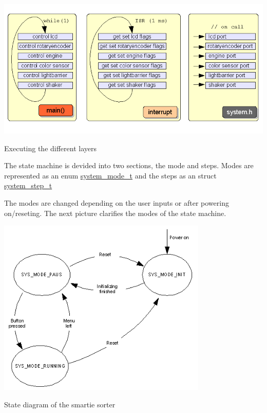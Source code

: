  \begin{Image}
\begin{center}
\includegraphics[width=15cm]{state-machine.png}\caption{Executing the different layers}
\end{center}
\end{Image}


The state machine is devided into two sections, the mode and steps. Modes are represented as an enum \hyperlink{system_8h_6e4cea4b6246f491c526211f5405627d}{system\_\-mode\_\-t} and the steps as an struct \hyperlink{structsystem__step__t}{system\_\-step\_\-t}

The modes are changed depending on the user inputs or after powering on/reseting. The next picture clarifies the modes of the state machine.

 \begin{Image}
\begin{center}
\includegraphics[width=10cm]{state-machine-modes.png}\caption{State diagram of the smartie sorter}
\end{center}
\end{Image}


